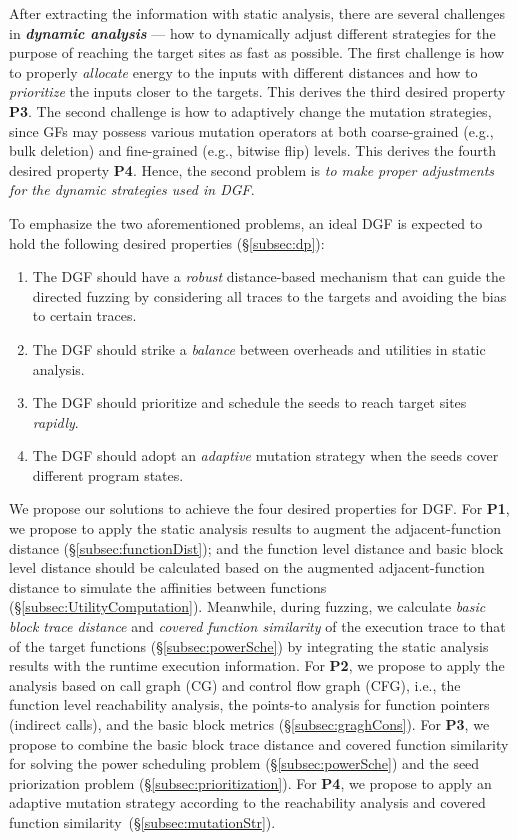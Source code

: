 After extracting the information with static analysis, there are several  challenges in \textbf{\emph{dynamic analysis}} --- how to dynamically adjust different strategies for the purpose of reaching the target sites as fast as possible.
The first challenge is how to properly \emph{allocate} energy to the inputs with different distances and how to \emph{prioritize} the inputs closer to the targets.
This derives the third desired property \textbf{P3}.
The second challenge is how to adaptively change the mutation strategies, since GFs may possess various mutation operators at both coarse-grained (e.g., bulk deletion) and fine-grained (e.g., bitwise flip) levels.
 This derives the fourth desired property \textbf{P4}.
Hence, the second problem is \emph{to make proper adjustments for the dynamic strategies used in DGF}.


To emphasize the two aforementioned problems, an ideal DGF is expected to hold the following desired properties (\S\ref{subsec:dp}):
\begin{enumerate}[\textbf{P}1]
\itemsep0em 
\item The DGF should have a \emph{robust} distance-based mechanism that can guide the directed fuzzing by considering all traces to the targets and avoiding the bias to certain traces.
\item The DGF should strike a \emph{balance} between overheads and utilities in static analysis.
\item The DGF should prioritize and schedule the seeds to reach target sites \emph{rapidly}.\item The DGF should adopt an \emph{adaptive} mutation strategy when the seeds cover different program states. \end{enumerate}


We propose our solutions to achieve the four desired properties for DGF. 
For \textbf{P1}, we propose to apply the static analysis results to augment the adjacent-function distance (\S\ref{subsec:functionDist}); and the function level distance and basic block level distance should be calculated based on the augmented adjacent-function distance to simulate the affinities between functions (\S\ref{subsec:UtilityComputation}).
Meanwhile, during fuzzing, we calculate \emph{basic block trace distance} and \emph{covered function similarity} of the execution trace to that of the target functions (\S\ref{subsec:powerSche}) by integrating the static analysis results with the runtime execution information.
For \textbf{P2}, we propose to apply the analysis based on call graph (CG) and control flow graph (CFG), i.e., the function level reachability analysis, the points-to analysis for function pointers (indirect calls), and the basic block metrics (\S\ref{subsec:graghCons}). 
For \textbf{P3}, we propose to combine the basic block trace distance and covered function similarity for solving the power scheduling problem (\S\ref{subsec:powerSche}) and the seed priorization problem (\S\ref{subsec:prioritization}). 
For \textbf{P4}, we propose to apply an adaptive mutation strategy according to the reachability analysis and covered function similarity~(\S\ref{subsec:mutationStr}).

